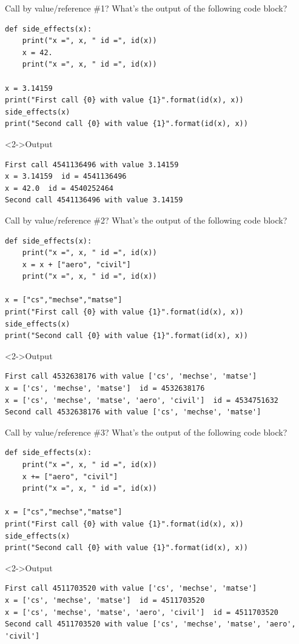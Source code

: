 \documentclass[presentation]{beamer}
\begin{document}
\begin{frame}[label={sec:org19ca9a2},fragile]{Call by value/reference \#1?}
 What's the output of the following code block?
\footnotesize
\begin{verbatim}
def side_effects(x):
    print("x =", x, " id =", id(x))
    x = 42.
    print("x =", x, " id =", id(x))

x = 3.14159
print("First call {0} with value {1}".format(id(x), x))
side_effects(x)
print("Second call {0} with value {1}".format(id(x), x))
\end{verbatim}
\begin{block}<2->{Output}
\footnotesize
\begin{verbatim}
First call 4541136496 with value 3.14159
x = 3.14159  id = 4541136496
x = 42.0  id = 4540252464
Second call 4541136496 with value 3.14159
\end{verbatim}
\end{block}
\end{frame}
\begin{frame}[label={sec:orgc731b53},fragile]{Call by value/reference \#2?}
 What's the output of the following code block?
\footnotesize
\begin{verbatim}
def side_effects(x):
    print("x =", x, " id =", id(x))
    x = x + ["aero", "civil"]
    print("x =", x, " id =", id(x))

x = ["cs","mechse","matse"]
print("First call {0} with value {1}".format(id(x), x))
side_effects(x)
print("Second call {0} with value {1}".format(id(x), x))
\end{verbatim}
\begin{block}<2->{Output}
\scriptsize
\begin{verbatim}
First call 4532638176 with value ['cs', 'mechse', 'matse']
x = ['cs', 'mechse', 'matse']  id = 4532638176
x = ['cs', 'mechse', 'matse', 'aero', 'civil']  id = 4534751632
Second call 4532638176 with value ['cs', 'mechse', 'matse']
\end{verbatim}
\end{block}
\end{frame}
\begin{frame}[label={sec:orge19077d},fragile]{Call by value/reference \#3?}
 What's the output of the following code block?
\footnotesize
\begin{verbatim}
def side_effects(x):
    print("x =", x, " id =", id(x))
    x += ["aero", "civil"]
    print("x =", x, " id =", id(x))

x = ["cs","mechse","matse"]
print("First call {0} with value {1}".format(id(x), x))
side_effects(x)
print("Second call {0} with value {1}".format(id(x), x))
\end{verbatim}
\begin{block}<2->{Output}
\scriptsize
\begin{verbatim}
First call 4511703520 with value ['cs', 'mechse', 'matse']
x = ['cs', 'mechse', 'matse']  id = 4511703520
x = ['cs', 'mechse', 'matse', 'aero', 'civil']  id = 4511703520
Second call 4511703520 with value ['cs', 'mechse', 'matse', 'aero', 'civil']
\end{verbatim}
\end{block}
\end{frame}
\end{document}
